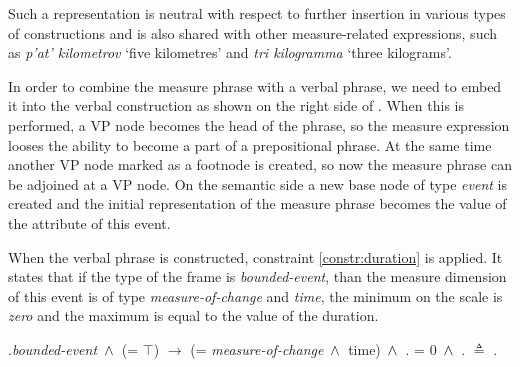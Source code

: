 Such a representation is neutral with respect to further insertion in various types of constructions and is also shared with other measure-related expressions, such as \textit{p'at' kilometrov} `five kilometres' and \textit{tri kilogramma} `three kilograms'.

In order to combine the measure phrase with a verbal phrase, we need to embed it into the verbal construction as shown on the right side of . When this is performed, a VP node becomes the head of the phrase, so the measure expression looses the ability to become a part of a prepositional phrase. At the same time another VP node marked as a footnode is created, so now the measure phrase can be adjoined at a VP node.  On the semantic side a new base node of type \textit{event} is created and the initial representation of the measure phrase becomes the value of the \DURATION attribute of this event.

When the verbal phrase is constructed, constraint \ref{constr:duration} is applied. It states that if the type of the frame is \textit{bounded-event}, than the measure dimension of this event is of type \textit{measure-of-change} and \textit{time}, the minimum on the scale is \textit{zero} and the maximum is equal to the value of the duration.

\ex.\label{constr:duration}\textit{bounded-event} $\,\wedge\,$ (\DURATION = $\top$) $\rightarrow$ (\MDIM = \textit{measure-of-change} $\,\wedge\,$ time) $\,\wedge\,$  \MDIM . \MIN = 0 $\,\wedge\,$ \MDIM . \MAX $\triangleq$ \DURATION .\VAL



